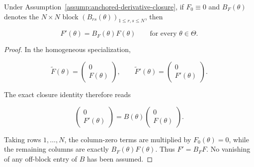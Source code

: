 \begin{lemma}
\label{lem:step-001-homogeneous-block}

Under Assumption~\ref{assump:anchored-derivative-closure}, if \(F_0\equiv0\) and \(B_F(\theta)\) denotes the
\(N\times N\) block \((B_{rs}(\theta))_{1\leq r,s\leq N}\), then

\begin{equation}
\label{eq:appendix-display-010}
F'(\theta)=B_F(\theta)F(\theta)
\qquad\text{for every }\theta\in\Theta.
\end{equation}


\end{lemma}

\begin{proof}
In the homogeneous specialization,

\begin{equation}
\label{eq:appendix-display-011}
\widetilde F(\theta)=
\begin{pmatrix}0\\F(\theta)\end{pmatrix},
\qquad
\widetilde F'(\theta)=
\begin{pmatrix}0\\F'(\theta)\end{pmatrix}.
\end{equation}

The exact closure identity therefore reads

\begin{equation}
\label{eq:appendix-display-012}
\begin{pmatrix}0\\F'(\theta)\end{pmatrix}
=B(\theta)
\begin{pmatrix}0\\F(\theta)\end{pmatrix}.
\end{equation}

Taking rows \(1,\ldots,N\), the column-zero terms are multiplied by \(F_0(\theta)=0\), while the remaining
columns are exactly \(B_F(\theta)F(\theta)\). Thus \(F'=B_FF\). No vanishing of any off-block entry of \(B\)
has been assumed. 
\end{proof}

